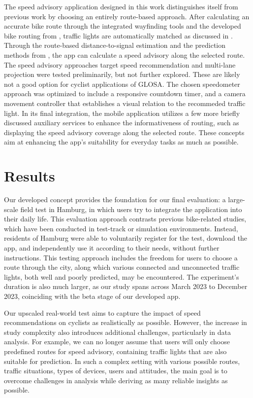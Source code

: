 \begin{Summary}
The speed advisory application designed in this work distinguishes itself from previous work by choosing an entirely route-based approach. After calculating an accurate bike route through the integrated wayfinding tools and the developed bike routing from , traffic lights are automatically matched as discussed in . Through the route-based distance-to-signal estimation and the prediction methods from , the app can calculate a speed advisory along the selected route. The speed advisory approaches target speed recommendation and multi-lane projection were tested preliminarily, but not further explored. These are likely not a good option for cyclist applications of GLOSA. The chosen speedometer approach was optimized to include a responsive countdown timer, and a camera movement controller that establishes a visual relation to the recommeded traffic light. In its final integration, the mobile application utilizes a few more briefly discussed auxiliary services to enhance the informativeness of routing, such as displaying the speed advisory coverage along the selected route. These concepts aim at enhancing the app's suitability for everyday tasks as much as possible. 
\end{Summary}

\section{Results}

Our developed concept provides the foundation for our final evaluation: a large-scale field test in Hamburg, in which users try to integrate the application into their daily life. This evaluation approach contrasts previous bike-related studies, which have been conducted in test-track or simulation environments. Instead, residents of Hamburg were able to voluntarily register for the test, download the app, and independently use it according to their needs, without further instructions. This testing approach includes the freedom for users to choose a route through the city, along which various connected and unconnected traffic lights, both well and poorly predicted, may be encountered. The experiment's duration is also much larger, as our study spans across March 2023 to December 2023, coinciding with the beta stage of our developed app.

Our upscaled real-world test aims to capture the impact of speed recommendations on cyclists as realistically as possible. However, the increase in study complexity also introduces additional challenges, particularly in data analysis. For example, we can no longer assume that users will only choose predefined routes for speed advisory, containing traffic lights that are also suitable for prediction. In such a complex setting with various possible routes, traffic situations, types of devices, users and attitudes, the main goal is to overcome challenges in analysis while deriving as many reliable insights as possible. 

